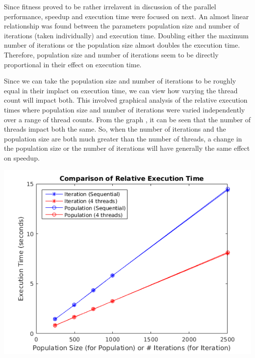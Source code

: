 \documentclass[10pt,letterpaper]{article}
\begin{document}
Since fitness proved to be rather irrelavent in discussion of the parallel performance, speedup and execution time were focused on next. An almost linear relationship was found between the parameters population size and number of iterations (taken individually) and execution time. Doubling either the maximum number of iterations or the population size almost doubles the execution time. Therefore, population size and number of iterations seem to be directly proportional in their effect on execution time.

Since we can take the population size and number of iterations to be roughly equal in their implact on execution time, we can view how varying the thread count will impact both. This involved graphical analysis of the relative execution times where population size and number of iterations were varied independently over a range of thread counts. From the graph %
, it can be seen that the number of threads impact both the same. So, when the number of iterations and the population size are both much greater than the number of threads, a change in the population size or the number of iterations will have generally the same effect on speedup.

\includegraphics[scale=1]{../img/Lenovo_Compare_ItervsPop.png} 
\end{document}
